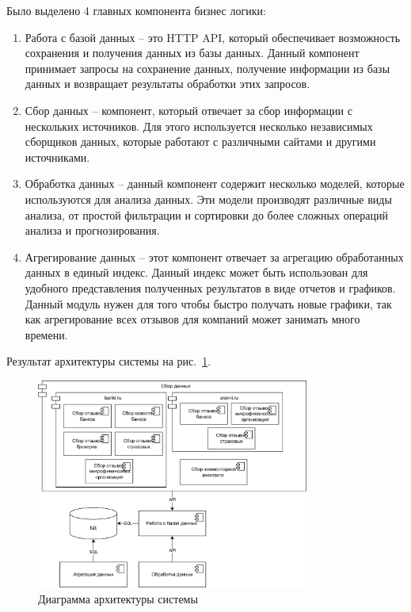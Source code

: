 \documentclass{article}
\begin{document}
Было выделено 4 главных компонента бизнес логики:
\begin{enumerate}
\item Работа с базой данных -- это HTTP API, который обеспечивает возможность сохранения и получения данных из базы данных. Данный компонент принимает запросы на сохранение данных, получение информации из базы данных и возвращает результаты обработки этих запросов.
\item Сбор данных -- компонент, который отвечает за сбор информации с нескольких источников. Для этого используется несколько независимых сборщиков данных, которые работают с различными сайтами и другими источниками.
\item Обработка данных -- данный компонент содержит несколько моделей, которые используются для анализа данных. Эти модели производят различные виды анализа, от простой фильтрации и сортировки до более сложных операций анализа и прогнозирования.
\item Агрегирование данных -- этот компонент отвечает за агрегацию обработанных данных в единый индекс. Данный индекс может быть использован для удобного представления полученных результатов в виде отчетов и графиков. Данный модуль нужен для того чтобы быстро получать новые графики, так как агрегирование всех отзывов для компаний может занимать много времени.
\end{enumerate}

Результат архитектуры системы на рис.~\ref{fig:architecture}.

\begin{figure}[h!]
\centering
\includegraphics[width=0.8\textwidth]{img/architecture.png}
\caption{\label{fig:architecture}Диаграмма архитектуры системы}
\end{figure}
\end{document}
